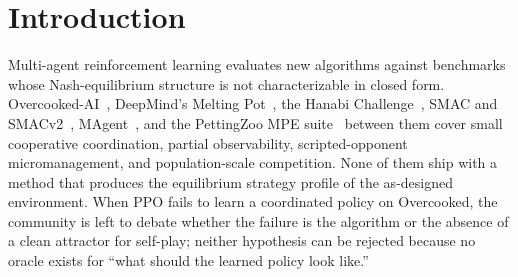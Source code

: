 \documentclass{anvil-paper}
\begin{document}
\begin{abstract}
converged NE profile is identical across $\beta$ within each
$(\kappa,c)$ column while trainability varies, \emph{no} statistic of
the NE profile can explain the within-column variance; the replacement
coordination-threshold ($k^{*}$) hypothesis is stated with its validation
explicitly pending. On the social-trap scenario \texttt{rest\_trap-v1},
whose frozen equilibrium is team-suboptimal by construction, an
all-scripted specialist team scores $386.6$/step where $20$-seed PPO
reaches $306.3$~--~statistically indistinguishable from uniform-random
play ($302.9$)~--~a machine-verdicted ${\approx}80$/step learnability gap
that gives the benchmark a measured, currently-uncaptured headroom
target. The quantitative
$\kappa$-thresholds of the reduction disagree with the equilibrium solver
by $3$--$10\times$; we own this gap and attribute it to ring-locality,
per-agent ownership rewards, and the heuristic-strategy approximation. We position Bucket Brigade as a \emph{methodological
complement} to the surveyed benchmarks, not a replacement: it is the only
published parametric MARL game where the question ``did the algorithm
converge to the right equilibrium?'' admits a ground-truth answer.
\end{abstract}

\section{Introduction}
\label{sec:intro}

Multi-agent reinforcement learning evaluates new algorithms against benchmarks
whose Nash-equilibrium structure is not characterizable in closed form.
Overcooked-AI~\citep{overcooked2019}, DeepMind's Melting
Pot~\citep{meltingpot2021}, the Hanabi
Challenge~\citep{hanabi2020}, SMAC and SMACv2~\citep{smac2019,smacv2_2023},
MAgent~\citep{magent2018}, and the PettingZoo MPE
suite~\citep{pettingzoo2021} between them cover small cooperative
coordination, partial observability, scripted-opponent micromanagement, and
population-scale competition. None of them ship with a method that produces
the equilibrium strategy profile of the as-designed environment. When PPO
fails to learn a coordinated policy on Overcooked, the community is left to
debate whether the failure is the algorithm or the absence of a clean
attractor for self-play; neither hypothesis can be rejected because no oracle
exists for ``what should the learned policy look like.''
\end{document}

